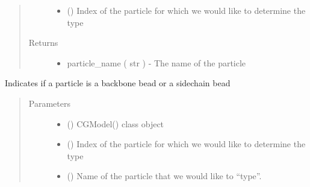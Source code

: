 \documentclass[letterpaper,12pt,english,openany,oneside]{sphinxmanual}
\begin{document}
\begin{fulllineitems}
\begin{fulllineitems}
\begin{quote}
\begin{description}
\begin{itemize}
\item {} 
 () \textendash{} Index of the particle for which we would like to determine the type

\end{itemize}

\item[{Returns}] \leavevmode
\begin{itemize}
\item {} 
particle\_name ( str ) - The name of the particle

\end{itemize}


\end{description}\end{quote}

\end{fulllineitems}


\begin{fulllineitems}
\label{\detokenize{cg_model:cg_model.cgmodel.CGModel.get_particle_type}}
Indicates if a particle is a backbone bead or a sidechain bead
\begin{quote}\begin{description}
\item[{Parameters}] \leavevmode\begin{itemize}
\item {} 
 () \textendash{} CGModel() class object

\item {} 
 () \textendash{} Index of the particle for which we would like to determine the type

\item {} 
 () \textendash{} Name of the particle that we would like to “type”.


\end{itemize}
\end{description}
\end{quote}
\end{fulllineitems}
\end{fulllineitems}
\end{document}
